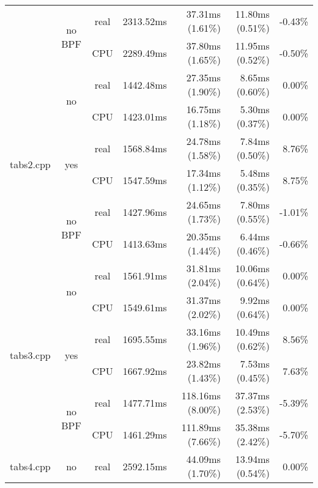 \documentclass[en]{pracamgr}
\begin{document}
\begin{small}
\begin{longtable}{|l|c|c|r|r|r|r|}
                            \cline{2-7}
                            & \multirow{2}{*}{no BPF} & real & 2313.52ms & 37.31ms (1.61\%) & 11.80ms (0.51\%) & -0.43\% \\*
                            &                         & CPU  & 2289.49ms & 37.80ms (1.65\%) & 11.95ms (0.52\%) & -0.50\% \\
\hline
\multirow{6}{*}{tabs2.cpp}  & \multirow{2}{*}{no}     & real & 1442.48ms & 27.35ms (1.90\%) & 8.65ms (0.60\%) & 0.00\% \\*
                            &                         & CPU  & 1423.01ms & 16.75ms (1.18\%) & 5.30ms (0.37\%) & 0.00\% \\*
                            \cline{2-7}
                            & \multirow{2}{*}{yes}    & real & 1568.84ms & 24.78ms (1.58\%) & 7.84ms (0.50\%) & 8.76\% \\*
                            &                         & CPU  & 1547.59ms & 17.34ms (1.12\%) & 5.48ms (0.35\%) & 8.75\% \\*
                            \cline{2-7}
                            & \multirow{2}{*}{no BPF} & real & 1427.96ms & 24.65ms (1.73\%) & 7.80ms (0.55\%) & -1.01\% \\*
                            &                         & CPU  & 1413.63ms & 20.35ms (1.44\%) & 6.44ms (0.46\%) & -0.66\% \\
\hline
\multirow{6}{*}{tabs3.cpp}  & \multirow{2}{*}{no}     & real & 1561.91ms & 31.81ms (2.04\%) & 10.06ms (0.64\%) & 0.00\% \\*
                            &                         & CPU  & 1549.61ms & 31.37ms (2.02\%) & 9.92ms (0.64\%) & 0.00\% \\*
                            \cline{2-7}
                            & \multirow{2}{*}{yes}    & real & 1695.55ms & 33.16ms (1.96\%) & 10.49ms (0.62\%) & 8.56\% \\*
                            &                         & CPU  & 1667.92ms & 23.82ms (1.43\%) & 7.53ms (0.45\%) & 7.63\% \\*
                            \cline{2-7}
                            & \multirow{2}{*}{no BPF} & real & 1477.71ms & 118.16ms (8.00\%) & 37.37ms (2.53\%) & -5.39\% \\*
                            &                         & CPU  & 1461.29ms & 111.89ms (7.66\%) & 35.38ms (2.42\%) & -5.70\% \\
\hline
\multirow{6}{*}{tabs4.cpp}  & \multirow{2}{*}{no}     & real & 2592.15ms & 44.09ms (1.70\%) & 13.94ms (0.54\%) & 0.00\% \\*

\end{longtable}
\end{small}
\end{document}
